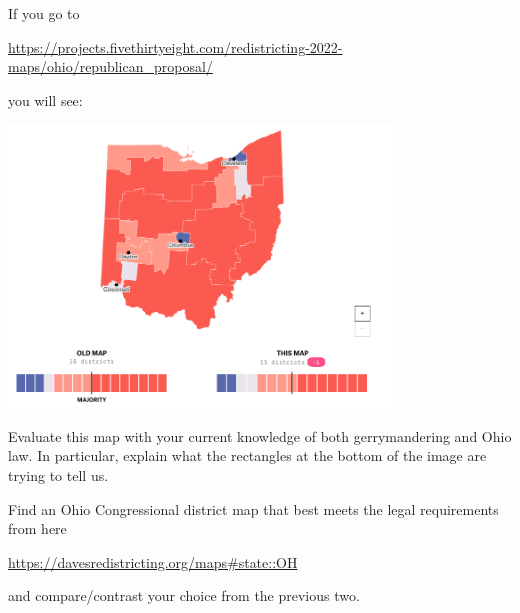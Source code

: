 \documentclass[noauthor,nooutcomes,hints,handout,12pt]{ximera}
\begin{document}
\begin{question}
  If you go to
  \begin{center}
  \url{https://projects.fivethirtyeight.com/redistricting-2022-maps/ohio/republican_proposal/}
  \end{center}
  you will see:
  \begin{center}
    \includegraphics[width=4in]{repProp.png}
  \end{center}
  Evaluate this map with your current knowledge of both gerrymandering
  and Ohio law.  In particular, explain what the rectangles at the
  bottom of the image are trying to tell us.
\end{question}



\mynewpage

\begin{question}
  Find an Ohio Congressional district map that best meets the legal
  requirements from here
  \begin{center}
    \url{https://davesredistricting.org/maps#state::OH}
  \end{center}
  and compare/contrast your choice from the previous two.
\end{question}
\end{document}
